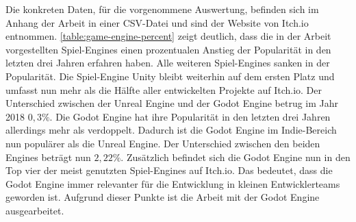 Die konkreten Daten, für die vorgenommene Auswertung, befinden sich im Anhang der Arbeit in einer \ac{CSV}-Datei und sind der Website von Itch.io entnommen\cite{most-projects}.
\autoref{table:game-engine-percent} zeigt deutlich, dass die in der Arbeit vorgestellten Spiel-Engines einen prozentualen Anstieg der Popularität in den letzten drei Jahren erfahren haben.
Alle weiteren Spiel-Engines sanken in der Popularität.
Die Spiel-Engine Unity bleibt weiterhin auf dem ersten Platz und umfasst nun mehr als die Hälfte aller entwickelten Projekte auf Itch.io.
Der Unterschied zwischen der Unreal Engine und der Godot Engine betrug im Jahr 2018 $0{,}3\%$.
Die Godot Engine hat ihre Popularität in den letzten drei Jahren allerdings mehr als verdoppelt.
Dadurch ist die Godot Engine im Indie-Bereich nun populärer als die Unreal Engine.
Der Unterschied zwischen den beiden Engines beträgt nun $2{,}22\%$.
Zusätzlich befindet sich die Godot Engine nun in den Top vier der meist genutzten Spiel-Engines auf Itch.io.
Das bedeutet, dass die Godot Engine immer relevanter für die Entwicklung in kleinen Entwicklerteams geworden ist.
Aufgrund dieser Punkte ist die Arbeit mit der Godot Engine ausgearbeitet. \\
